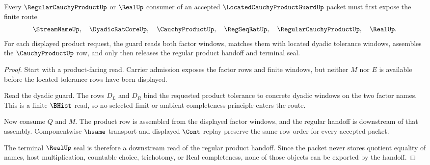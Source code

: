 \begin{theorem}
\label{thm:located-cauchy-product-guard-regular-product-handoff}
Every $\RegularCauchyProductUp$ or $\RealUp$ consumer of an accepted $\LocatedCauchyProductGuardUp$ packet must first expose the finite route
$$
\StreamNameUp,\quad
\DyadicRatCoreUp,\quad
\CauchyProductUp,\quad
\RegSeqRatUp,\quad
\RegularCauchyProductUp,\quad
\RealUp .
$$
For each displayed product request, the guard reads both factor windows, matches them with located dyadic tolerance windows, assembles the $\CauchyProductUp$ row, and only then releases the regular product handoff and terminal seal.
\end{theorem}
\begin{proof}
Start with a product-facing read. Carrier admission exposes the factor rows and finite windows, but neither $M$ nor $E$ is available before the located tolerance rows have been displayed.

Read the dyadic guard. The rows $D_L$ and $D_R$ bind the requested product tolerance to concrete dyadic windows on the two factor names. This is a finite $\BHist$ read, so no selected limit or ambient completeness principle enters the route.

Now consume $Q$ and $M$. The product row is assembled from the displayed factor windows, and the regular handoff is downstream of that assembly. Componentwise $\hsame$ transport and displayed $\Cont$ replay preserve the same row order for every accepted packet.

The terminal $\RealUp$ seal is therefore a downstream read of the regular product handoff. Since the packet never stores quotient equality of names, host multiplication, countable choice, trichotomy, or Real completeness, none of those objects can be exported by the handoff.
\end{proof}



